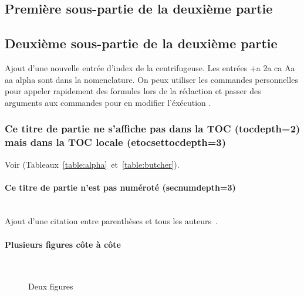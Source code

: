 	\subsection{Première sous-partie de la deuxième partie}

		\lipsum[4]

	\subsection[Sous-partie 2]{Deuxième sous-partie de la deuxième partie} %

		Ajout d'une nouvelle entrée d'index de la centrifugeuse. Les entrées \gls{+a} \gls{2a} \gls{ca} \gls{Aa} \gls{aa} \gls{alpha} {\NoAutoSpaceBeforeFDP}sont dans la nomenclature. On peux utiliser les commandes personnelles pour appeler rapidement des formules lors de la rédaction \acc et passer des arguments aux commandes pour en modifier l'éxécution \emiss[\nu]{\Omega}.

		\subsubsection{Ce titre de partie ne s'affiche pas dans la TOC (tocdepth=2) mais dans la TOC locale (etocsettocdepth=3)}

			Voir (Tableaux~\ref{table:alpha}~et~\ref{table:butcher}).

			\paragraph{Ce titre de partie n'est pas numéroté (secnumdepth=3)}~~\\ %

				Ajout d'une citation entre parenthèses et tous les auteurs~\parencite{zohdy_mapping_2012}.

			\paragraph{Plusieurs figures côte à côte}~~\\

				\lipsum[66]


				\begin{figure}
					\centering
					\caption{Deux figures}
					\label{fig:deux_figures}
				\end{figure}

